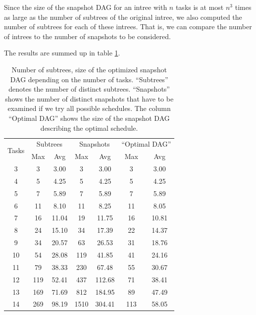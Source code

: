Since the size of the snapshot DAG for an intree with $n$ tasks is at most $n^3$ times as large as the number of subtrees of the original intree, we also computed the number of subtrees for each of these intrees.
That is, we can compare the number of intrees to the number of snapshots to be considered.

The results are summed up in table \ref{tab:num-subtrees-size-of-dags}.

\begin{table}[ht]
  \centering
  \begin{tabular}[ht]{ccccccc}
    \multirow{2}{*}{Tasks} & \multicolumn{2}{c}{Subtrees} & \multicolumn{2}{c}{Snapshots} & \multicolumn{2}{c}{``Optimal DAG''} \\
    & Max & Avg & Max & Avg & Max & Avg \\
    \hline
    3 & 3 & 3.00 & 3 & 3.00 & 3 & 3.00  \\
    4 & 5 & 4.25 & 5 & 4.25 & 5 & 4.25  \\
    5 & 7 & 5.89 & 7 & 5.89 & 7 & 5.89  \\
    6 & 11 & 8.10 & 11 & 8.25 & 11 & 8.05  \\
    7 & 16 & 11.04 & 19 & 11.75 & 16 & 10.81  \\
    8 & 24 &  15.10 & 34 & 17.39 & 22 & 14.37  \\
    9 & 34 &  20.57 & 63 & 26.53 & 31 & 18.76  \\
    10 & 54 &  28.08 & 119 & 41.85 & 41 & 24.16  \\
    11 & 79 &  38.33 & 230 & 67.48 & 55 & 30.67  \\
    12 & 119 & 52.41 & 437 & 112.68 & 71 & 38.41  \\
    13 & 169 &  71.69 & 812 & 184.95 & 89 & 47.49  \\
    14 & 269 &  98.19 & 1510 & 304.41 & 113 & 58.05  \\
  \end{tabular}
  \caption{Number of subtrees, size of the optimized snapshot DAG depending on the number of tasks. ``Subtrees'' denotes the number of distinct subtrees. ``Snapshots'' shows the number of distinct snapshots that have to be examined if we try all possible schedules. The column ``Optimal DAG'' shows the size of the snapshot DAG describing the optimal schedule.}
  \label{tab:num-subtrees-size-of-dags}
\end{table}

